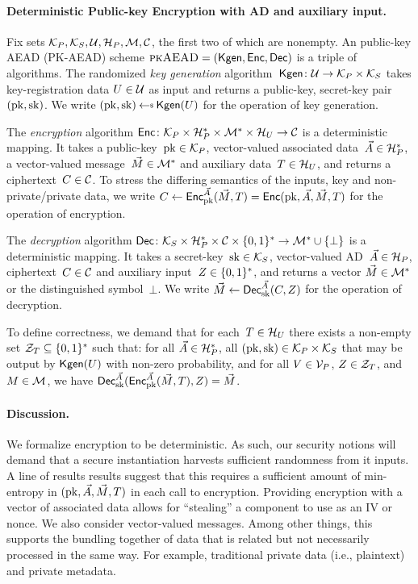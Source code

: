 \paragraph{Deterministic Public-key Encryption with AD and auxiliary input. }
Fix sets $\mathcal{K}_P, \mathcal{K}_S, \mathcal{U}, \mathcal{H}_P, \mathcal{M},\mathcal{C}$, the first two of which are nonempty.  An public-key AEAD
(PK-AEAD) scheme $\textsc{pkAEAD}=(\mathsf{Kgen},{\mathsf{Enc}},{\mathsf{Dec}})$ is a triple of algorithms.  The randomized \emph{key generation} algorithm~$\mathsf{Kgen}\colon\mathcal{U}\to\mathcal{K}_P\times\mathcal{K}_S$ takes key-registration data $U \in \mathcal{U}$ as input and returns a public-key, secret-key pair $(\mathrm{pk},\mathrm{sk})$.  We write $(\pk,\sk)\getsr\Kgen(\kreg)$ for the operation of key generation. 

The \emph{encryption} algorithm ${\mathsf{Enc}} \colon \mathcal{K}_P \times \mathcal{H}_P^* \times \mathcal{M}^* \times \mathcal{H}_U \to \mathcal{C}$ is a deterministic mapping.  It takes a public-key~$\mathrm{pk}\in\mathcal{K}_P$, vector-valued associated data~$\vec{A} \in \mathcal{H}_P^*$,  a vector-valued message~$\vec{M} \in \mathcal{M}^*$ and auxiliary data~$T \in \mathcal{H}_U$, and returns a ciphertext~$C \in \mathcal{C}$. 
To stress the differing semantics of the inputs, key and non-private/private data, we write $C\gets{\mathsf{Enc}}_{\mathrm{pk}}^{\vec{A}}(\vec{M},T) ={\mathsf{Enc}}(\mathrm{pk},\vec{A}, \vec{M},T)$ for the operation of encryption. 


The \emph{decryption} algorithm ${\mathsf{Dec}} \colon \mathcal{K}_S \times \mathcal{H}_P^* \times \mathcal{C} \times \{0,1\}^* \to \mathcal{M}^* \cup \{\bot\}$ is a deterministic mapping.  It takes a secret-key~$\mathrm{sk}\in\mathcal{K}_S$, vector-valued AD~$\vec{A} \in \mathcal{H}_P$, ciphertext~$C \in \mathcal{C}$ and auxiliary input~$Z\in\{0,1\}^*$, and returns a vector $\vec{M} \in \mathcal{M}^*$ or the distinguished symbol~$\bot$.  We write $\vec{M} \gets {\mathsf{Dec}}_{\mathrm{sk}}^{\vec{A}}(C,Z)$ for the operation of decryption.   

To define correctness, we demand that for each~$T\in\mathcal{H}_U$ there exists a non-empty set $\mathcal{Z}_T \subseteq \{0,1\}^*$ such that:  for all $\vec{A}\in\mathcal{H}_P^*$, all $(\mathrm{pk},\mathrm{sk})\in\mathcal{K}_P\times\mathcal{K}_S$ that may be output by $\mathsf{Kgen}(U)$ with non-zero probability, and for all $V\in\mathcal{V}_P$, $Z\in\mathcal{Z}_T$,  and $M\in\mathcal{M}$, we have ${\mathsf{Dec}}_{\mathrm{sk}}^{\vec{A}}({\mathsf{Enc}}_{\mathrm{pk}}^{\vec{A}}(\vec{M},T),Z)=\vec{M}$. 

\paragraph{Discussion. } We formalize encryption to be deterministic.  As such, our security notions will demand that a secure instantiation harvests sufficient randomness from it inputs.  A line of results \cite{xxx,yyy,zzz} results suggest that this requires a sufficient amount of min-entropy in $(\mathrm{pk},\vec{A},\vec{M},T)$ in each call to encryption.  Providing encryption with a vector of associated data allows for ``stealing'' a component to use as an IV or nonce.  We also consider vector-valued messages.  Among other things, this supports the bundling together of data that is related but not necessarily processed in the same way.  For example, traditional private data (i.e., plaintext) and private metadata.  

